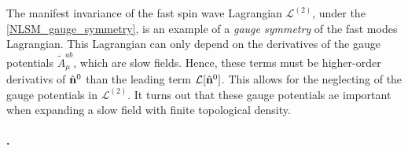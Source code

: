 \begin{itemize}
    The manifest invariance of the fast spin wave Lagrangian $\mathcal{L}^{(2)}$, under the \cref{NLSM_gauge_symmetry}, is an example 
    of a \textit{gauge symmetry} of the fast modes Lagrangian. This Lagrangian can only depend on the derivatives of the gauge potentials $\tilde{A}^{ab}_{\mu}$, which are slow fields. 
    Hence, these terms must be higher-order derivativs of $\hat{\bf n}^{0}$ than the leading term $\mathcal{L}[\hat{\bf n}^{0}]$. This allows for the neglecting of the gauge potentials in $\mathcal{L}^{(2)}$. 
    It turns out that these gauge potentials ae important when expanding a slow field with finite topological density. 
    
\end{itemize}

\paragraph{.}
